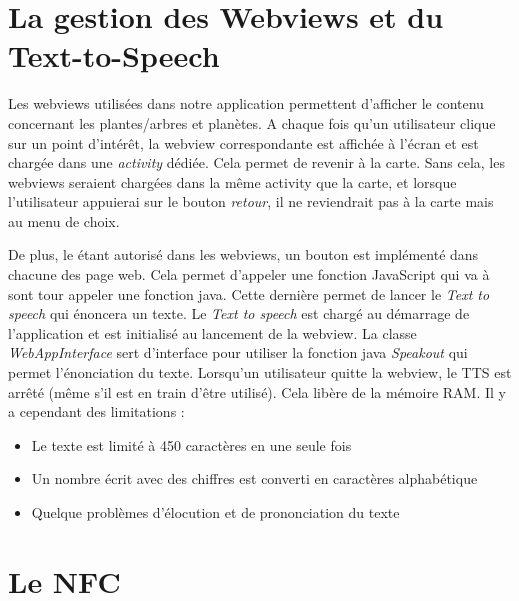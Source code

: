 \documentclass[a4paper,11pt]{article}
\begin{document}
		\section{La gestion des Webviews et du Text-to-Speech}
		Les webviews utilisées dans notre application permettent d'afficher le contenu concernant les plantes/arbres et planètes. A chaque fois qu'un utilisateur clique sur un point d'intérêt, la webview correspondante est affichée à l'écran et est chargée dans une \emph{activity} dédiée. Cela permet de revenir à la carte. Sans cela, les webviews seraient chargées dans la même activity que la carte, et lorsque l'utilisateur appuierai sur le bouton \emph{retour}, il ne reviendrait pas à la carte mais au menu de choix.
		
		De plus, le étant autorisé dans les webviews, un bouton est implémenté dans chacune des page web. Cela permet d'appeler une fonction JavaScript qui va à sont tour appeler une fonction java. Cette dernière permet de lancer le \emph{Text to speech} qui énoncera un texte.
		Le \emph{Text to speech} est chargé au démarrage de l’application et est initialisé au lancement de la webview. La classe \emph{WebAppInterface} sert d'interface pour utiliser la fonction java \emph{Speakout} qui permet l'énonciation du texte. Lorsqu'un utilisateur quitte la webview, le TTS est arrêté (même s'il est en train d'être utilisé). Cela libère de la mémoire RAM.
		Il y a cependant des limitations :
		\begin{itemize}
		\item Le texte est limité à 450 caractères en une seule fois
		\item Un nombre écrit avec des chiffres est converti en caractères alphabétique
		\item Quelque problèmes d'élocution et de prononciation du texte
		 
		\end{itemize}
    \newpage
    \section{Le NFC}
\end{document}
